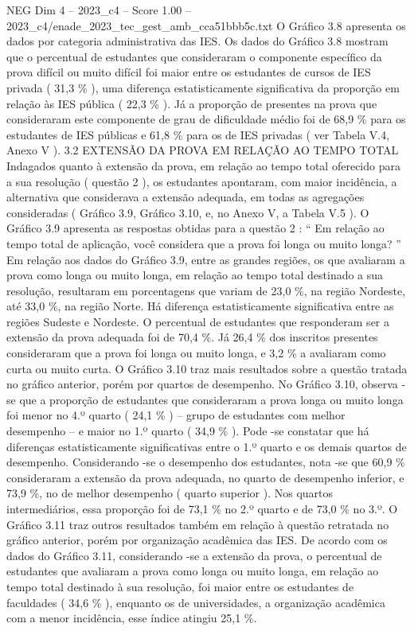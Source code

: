 \begin{textsample}{NEG Dim 4 – 2023\_c4 – Score 1.00 – 2023\_c4/enade\_2023\_tec\_gest\_amb\_cca51bbb5c.txt}
O Gráfico 3.8 apresenta os dados por categoria administrativa das IES.
Os dados do Gráfico 3.8 mostram que o percentual de estudantes que consideraram o componente específico da prova difícil ou muito difícil foi maior entre os estudantes de cursos de IES privada ( 31,3 \% ), uma diferença estatisticamente significativa da proporção em relação às IES pública ( 22,3 \% ).
Já a proporção de presentes na prova que consideraram este componente de grau de dificuldade médio foi de 68,9 \% para os estudantes de IES públicas e 61,8 \% para os de IES privadas ( ver Tabela V.4, Anexo V ). 3.2 EXTENSÃO DA PROVA EM RELAÇÃO AO TEMPO TOTAL Indagados quanto à extensão da prova, em relação ao tempo total oferecido para a sua resolução ( questão 2 ), os estudantes apontaram, com maior incidência, a alternativa que considerava a extensão adequada, em todas as agregações consideradas ( Gráfico 3.9, Gráfico 3.10, e, no Anexo V, a Tabela V.5 ).
O Gráfico 3.9 apresenta as respostas obtidas para a questão 2 : “ Em relação ao tempo total de aplicação, você considera que a prova foi longa ou muito longa? ” Em relação aos dados do Gráfico 3.9, entre as grandes regiões, os que avaliaram a prova como longa ou muito longa, em relação ao tempo total destinado a sua resolução, resultaram em porcentagens que variam de 23,0 \%, na região Nordeste, até 33,0 \%, na região Norte.
Há diferença estatisticamente significativa entre as regiões Sudeste e Nordeste.
O percentual de estudantes que responderam ser a extensão da prova adequada foi de 70,4 \%.
Já 26,4 \% dos inscritos presentes consideraram que a prova foi longa ou muito longa, e 3,2 \% a avaliaram como curta ou muito curta.
O Gráfico 3.10 traz mais resultados sobre a questão tratada no gráfico anterior, porém por quartos de desempenho.
No Gráfico 3.10, observa -se que a proporção de estudantes que consideraram a prova longa ou muito longa foi menor no 4.º quarto ( 24,1 \% ) – grupo de estudantes com melhor desempenho – e maior no 1.º quarto ( 34,9 \% ).
Pode -se constatar que há diferenças estatisticamente significativas entre o 1.º quarto e os demais quartos de desempenho.
Considerando -se o desempenho dos estudantes, nota -se que 60,9 \% consideraram a extensão da prova adequada, no quarto de desempenho inferior, e 73,9 \%, no de melhor desempenho ( quarto superior ).
Nos quartos intermediários, essa proporção foi de 73,1 \% no 2.º quarto e de 73,0 \% no 3.º.
O Gráfico 3.11 traz outros resultados também em relação à questão retratada no gráfico anterior, porém por organização acadêmica das IES.
De acordo com os dados do Gráfico 3.11, considerando -se a extensão da prova, o percentual de estudantes que avaliaram a prova como longa ou muito longa, em relação ao tempo total destinado à sua resolução, foi maior entre os estudantes de faculdades ( 34,6 \% ), enquanto os de universidades, a organização acadêmica com a menor incidência, esse índice atingiu 25,1 \%.

\end{textsample}
